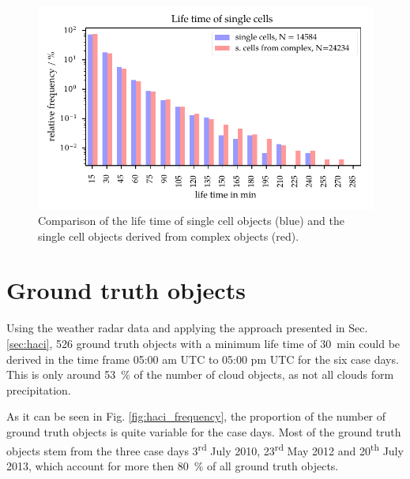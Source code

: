 \begin{figure}[htbp]
\centering
\includegraphics[width=\textwidth]{Grafiken/Abbildungen/single_from_complex_lifetime.pdf}
\caption{Comparison of the life time of single cell objects (blue) and the single cell objects derived from complex objects (red).}
\label{fig:single_cell}
\end{figure}

\section{Ground truth objects}
Using the weather radar data and applying the approach presented in Sec. \ref{sec:haci}, \num{526} ground truth objects with a minimum life time of \SI{30}{\minute} could be derived in the time frame 05:00 am UTC to 05:00 pm UTC for the six case days. This  is only around \SI{53}{\percent} of the number of cloud objects,  as not all clouds form precipitation. 

As it can be seen in Fig. \ref{fig:haci_frequency}, the proportion of the number of ground truth objects is quite variable for the case days. Most of the ground truth objects stem from the three case days 3\textsuperscript{rd} July 2010, 23\textsuperscript{rd} May 2012 and 20\textsuperscript{th} July 2013, which account for more then \SI{80}{\percent} of all ground truth objects. 

